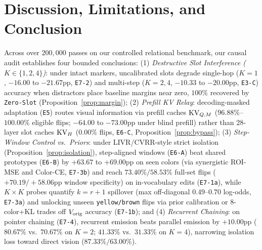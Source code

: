 \section{Discussion, Limitations, and Conclusion}
\label{sec:conclusion}

Across over $200,000$ passes on our controlled relational benchmark, our causal audit establishes four bounded conclusions:
(1) \emph{Destructive Slot Interference ($K \in \{1, 2, 4\}$)}: under intact markers, uncalibrated slots degrade single-hop ($K=1$, $-16.00$ to $-21.67$pp, \texttt{E7-2}) and multi-step ($K=2, 4$, $-10.33$ to $-20.00$pp, \texttt{E3-C}) accuracy when distractors place baseline margins near zero, $100\%$ recovered by \texttt{Zero-Slot} (Proposition~\ref{prop:margin});
(2) \emph{Prefill KV Relay}: decoding-masked adaptation (\texttt{E5}) routes visual information via prefill caches $\mathrm{KV}_{Q,M}$ ($96.88\%$--$100.00\%$ eligible flips; $-64.00$ to $-73.00$pp under blind prefill) rather than 28-layer slot caches $\mathrm{KV}_H$ ($0.00\%$ flips, \texttt{E6-C}, Proposition~\ref{prop:bypass});
(3) \emph{Step-Window Control vs.\ Priors}: under LIVR/CVRR-style strict isolation (Proposition~\ref{prop:isolation}), step-aligned windows (\texttt{E6-A}) beat shared prototypes (\texttt{E6-B}) by $+63.67$ to $+69.00$pp on seen colors (via synergistic ROI-MSE and Color-CE, \texttt{E7-3b}) and reach $73.40\%/58.53\%$ full-set flips ($+70.19/+58.06$pp window specificity) on in-vocabulary edits (\texttt{E7-1a}), while $K\times K$ probes quantify $k=r+1$ spillover (max off-diagonal $0.49$--$0.70$ log-odds, \texttt{E7-3a}) and unlocking unseen \texttt{yellow/brown} flips via prior calibration or 8-color+KL trades off $V_{\mathrm{orig}}$ accuracy (\texttt{E7-1b}); and
(4) \emph{Recurrent Chaining}: on pointer chaining (\texttt{E7-4}), recurrent emission beats parallel emission by $+10.00$pp ($80.67\%$ vs.\ $70.67\%$ on $K=2$; $41.33\%$ vs.\ $31.33\%$ on $K=4$), narrowing isolation loss toward direct vision ($87.33\%/63.00\%$).
